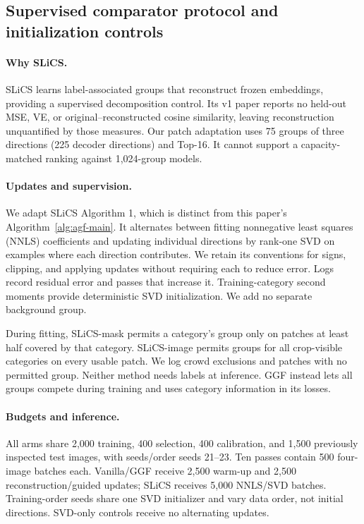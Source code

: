 \subsection{Supervised comparator protocol and initialization controls}\label{app:pending}\label{app:slics-results}

\paragraph{Why SLiCS.}
SLiCS \citep{li2025} learns label-associated groups that reconstruct frozen
embeddings, providing a supervised decomposition control. Its v1 paper reports
no held-out MSE, VE, or original--reconstructed cosine similarity, leaving
reconstruction unquantified by those measures. Our patch adaptation uses
75 groups of three directions (225 decoder directions) and Top-16. It cannot support a capacity-matched ranking against
1,024-group models.

\paragraph{Updates and supervision.}
We adapt SLiCS Algorithm 1, which is distinct from this paper's
Algorithm~\ref{alg:agf-main}. It alternates between fitting nonnegative least
squares (NNLS) coefficients and updating individual directions by rank-one
SVD on examples where each direction contributes. We retain its conventions
for signs, clipping, and applying updates without requiring each to reduce
error. Logs record residual error and passes that increase it. Training-category
second moments provide deterministic SVD initialization. We add no separate
background group.

During fitting, SLiCS-mask permits a category's group only on patches at
least half covered by that category. SLiCS-image permits groups for all
crop-visible categories on every usable patch. We log crowd exclusions
and patches with no permitted group. Neither method needs labels at
inference. GGF instead lets all groups compete during training and uses
category information in its losses.

\paragraph{Budgets and inference.}
All arms share 2,000 training, 400 selection, 400 calibration, and 1,500
previously inspected test images, with seeds/order seeds 21--23. Ten passes
contain 500 four-image batches each. Vanilla/GGF receive 2,500 warm-up and
2,500 reconstruction/guided updates; SLiCS receives 5,000 NNLS/SVD batches.
Training-order seeds share one SVD initializer and vary data order, not
initial directions. SVD-only controls receive no alternating updates.

